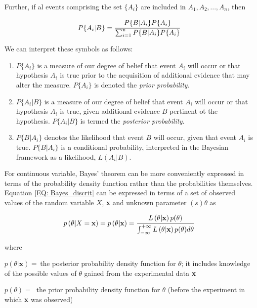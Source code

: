 \documentclass[a4paper,fleqn]{cas-dc}
\begin{document}
Further, if al events comprising the set $\{A_i\}$ are included in $A_1,A_2,...,A_n$, then

\begin{equation} \label{EQ: Bayes_discrit}
	P\{A_i|B\} = \cfrac{P\{B|A_i\}P\{A_i\}}{ \sum_{i=1}^{n} P\{B|A_i\} P\{A_i\} }
\end{equation}

We can interpret these symbols as follows:

\begin{enumerate}
	\item $P\{A_i\}$ is a measure of our degree of belief that event $A_i$ will occur or that hypothesis $A_i$ is true prior to the acquisition of additional evidence that may alter the measure. $P\{A_i\}$ is denoted the \textit{prior probability}.
	\item $P\{A_i|B\}$ is a measure of our degree of belief that event $A_i$ will occur or that hypothesis $A_i$ is true, given additional evidence $B$ pertinent ot the hypothesis. $P\{A_i|B\}$ is termed the \textit{posterior probability}.
	\item $P\{B|A_i\}$ denotes the likelihood that event $B$ will occur, given that event $A_i$ is true. $P\{B|A_i\}$ is a conditional probability, interpreted in the Bayesian framework as a likelihood, $L(A_i|B)$.
\end{enumerate}

For continuous variable, Bayes' theorem can be more conveniently expressed in terms of the probability density function rather than the probabilities themselves. Equation \ref{EQ: Bayes_discrit} can be expressed in terms of a set of observed values of the random variable $X$, \textbf{x} and unknown parameter $(s)\theta$ as

\begin{equation} \label{EQ: Bayes_continous}
	p\left( \theta|X=\textbf{x} \right) = p\left( \theta|\textbf{x} \right) = \cfrac{L\left( \theta|\textbf{x} \right) p(\theta)}{\int_{-\infty}^{+\infty} L\left( \theta|\textbf{x} \right) p(\theta) d\theta}
\end{equation}

where

$p(\theta|\textbf{x}) = ~$the posterior probability density function for $\theta$; it includes knowledge of the possible values of $\theta$ gained from the experimental data \textbf{x}

$p(\theta) = ~$ the prior probability density function for $\theta$ (before the experiment in which \textbf{x} was observed)
\end{document}
